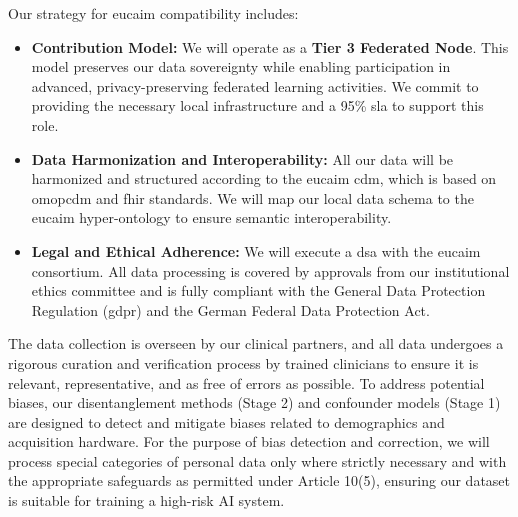 \documentclass[11pt, a4paper]{article}
\begin{document}
Our strategy for \gls{eucaim} compatibility includes:
\begin{itemize}
    \item \textbf{Contribution Model:} We will operate as a \textbf{Tier 3 Federated Node}. This model preserves our data sovereignty while enabling participation in advanced, privacy-preserving federated learning activities. We commit to providing the necessary local infrastructure and a 95\% \gls{sla} to support this role.
    \item \textbf{Data Harmonization and Interoperability:} All our data will be harmonized and structured according to the \gls{eucaim} \gls{cdm}, which is based on \gls{omopcdm} and \gls{fhir} standards. We will map our local data schema to the \gls{eucaim} hyper-ontology to ensure semantic interoperability.
    \item \textbf{Legal and Ethical Adherence:} We will execute a \gls{dsa} with the \gls{eucaim} consortium. All data processing is covered by approvals from our institutional ethics committee and is fully compliant with the General Data Protection Regulation (\gls{gdpr}) and the German Federal Data Protection Act.
\end{itemize}

The data collection is overseen by our clinical partners, and all data undergoes a rigorous curation and verification process by trained clinicians to ensure it is relevant, representative, and as free of errors as possible. To address potential biases, our disentanglement methods (Stage 2) and confounder models (Stage 1) are designed to detect and mitigate biases related to demographics and acquisition hardware. For the purpose of bias detection and correction, we will process special categories of personal data only where strictly necessary and with the appropriate safeguards as permitted under Article 10(5), ensuring our dataset is suitable for training a high-risk AI system.
\end{document}
